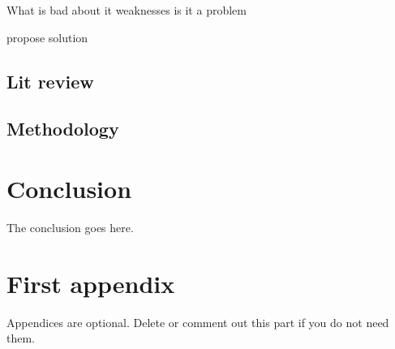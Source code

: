 \documentclass[journal]{IEEEtran}
\begin{document}
What is bad about it
weaknesses
is it a problem

propose solution

\subsection{Lit review}


\subsection{Methodology}

\section{Conclusion}
The conclusion goes here.






\appendices
\section{First appendix}
Appendices are optional. Delete or comment out this part if you do not need them.

\end{document}
